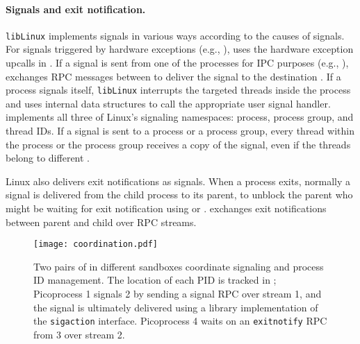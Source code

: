 \paragraph{Signals and exit notification.}
{\tt libLinux} implements signals
in various ways according to the causes of signals.
For signals triggered by hardware exceptions (e.g., ),
\thelibos{} uses the hardware exception upcalls
in \thehostabi{}.
If a signal is sent from one of the processes for IPC purposes (e.g., ),
\thelibos{} exchanges RPC messages between \picoprocs{} to deliver the signal to the destination \picoproc{}.
If a process signals itself, {\tt libLinux} interrupts the targeted threads inside the process
and uses internal data structures
to call the appropriate user signal handler.
\thelibos{} implements all three of Linux's signaling namespaces:
process, process group, and thread IDs.
If a signal is sent to a process or a process group,
every thread within the process or the process group receives a copy of the signal,
even if the threads belong to different \picoprocs{}.


Linux also delivers exit notifications as signals.
When a process exits, normally a  signal
is delivered from the child process to its parent,
to unblock the parent who might be waiting for exit notification using  or .
\thelibos{} exchanges exit notifications
between parent and child \picoprocs{} over RPC streams.



\begin{figure}
\centering
\texttt{[image: coordination.pdf]}
\caption{Two pairs of \graphene{} \picoprocs{} in different sandboxes 
coordinate signaling and process ID management.
The location of each PID is tracked in \thelibos{}; Picoprocess 1 signals
\picoproc{} 2 by sending a signal RPC over stream 1,
and the signal is ultimately delivered using a 
library implementation of the {\tt sigaction} interface. Picoprocess 4 
waits on an {\tt exitnotify} RPC from  \picoproc{} 3 over stream 2. }
\label{fig:libos:coordination}
\end{figure}


